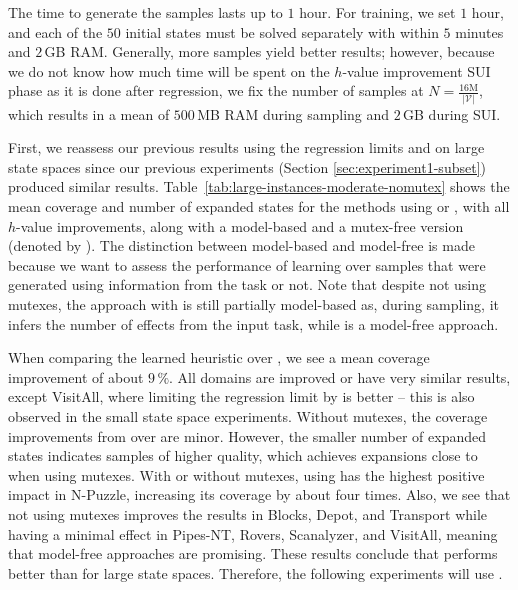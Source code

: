 The time to generate the samples lasts up to $1$ hour. For training, we set $1$ hour, and each of the $50$ initial states must be solved separately with \gbfs within $5$ minutes and $2$\,GB RAM. Generally, more samples yield better results; however, because we do not know how much time will be spent on the $h$-value improvement SUI phase as it is done after regression, we fix the number of samples at $N = \frac{16\text{M}}{|\mathcal{V}|}$, which results in a mean of $500$\,MB RAM during sampling and $2$\,GB during SUI.

First, we reassess our previous results using the regression limits \facts and \meanfx on large state spaces since our previous experiments (Section \ref{sec:experiment1-subset}) produced similar results. Table~\ref{tab:large-instances-moderate-nomutex} shows the mean coverage and number of expanded states for the methods using \facts or \meanfx, with all $h$-value improvements, along with a model-based and a mutex-free version (denoted by \hnnnomutex). The distinction between model-based and model-free is made because we want to assess the performance of learning over samples that were generated using information from the task or not. Note that despite not using mutexes, the approach with \hnnnomutexl{\meanfx} is still partially model-based as, during sampling, it infers the number of effects from the input task, while \hnnnomutexl{\facts} is a model-free approach.



When comparing the learned heuristic \hnnbfsrwl{\meanfx} over \hnnbfsrwl{\facts}, we see a mean coverage improvement of about $9\,\%$. All domains are improved or have very similar results, except VisitAll, where limiting the regression limit by \facts is better -- this is also observed in the small state space experiments. Without mutexes, the coverage improvements from \hnnnomutexl{\meanfx} over \hnnnomutexl{\facts} are minor. However, the smaller number of expanded states indicates samples of higher quality, which achieves expansions close to when using mutexes. With or without mutexes, using \meanfx has the highest positive impact in N-Puzzle, increasing its coverage by about four times. Also, we see that not using mutexes improves the results in Blocks, Depot, and Transport while having a minimal effect in Pipes-NT, Rovers, Scanalyzer, and VisitAll, meaning that model-free approaches are promising. These results conclude that \meanfx performs better than \facts for large state spaces. Therefore, the following experiments will use \meanfx.

